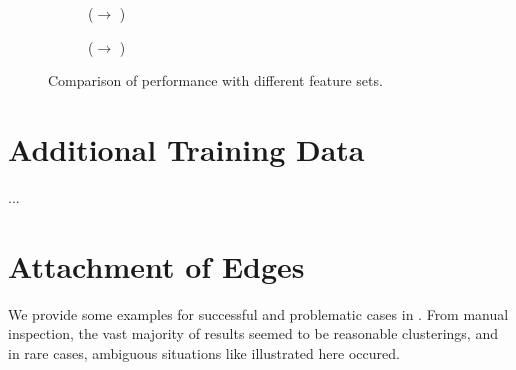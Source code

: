 \documentclass[
	fontsize=10pt, %
	twoside=false, %
	secnumdepth=1, %
  toc=indentunnumbered %
]{kaobook}
\begin{document}



\begin{figure}[h]
  \centering
  \begin{subfigure}{0.48\linewidth}
    \caption{(\ADLast $\rightarrow$ \PDMap)}
  \end{subfigure}
  \begin{subfigure}{0.48\linewidth}
    \caption{(\ADLast $\rightarrow$ \ReconMap)}
  \end{subfigure}
  \caption[Comparison of performance with different feature sets.]{Comparison of
    performance with different feature sets.}
  \label{fig:feature-importance}
\end{figure}




\section{Additional Training Data}

...


\section{Attachment of Edges}


We provide some examples for successful and problematic cases in
. From manual inspection, the vast majority of
results seemed to be reasonable clusterings, and in rare cases, ambiguous
situations like illustrated here occured.

\end{document}
